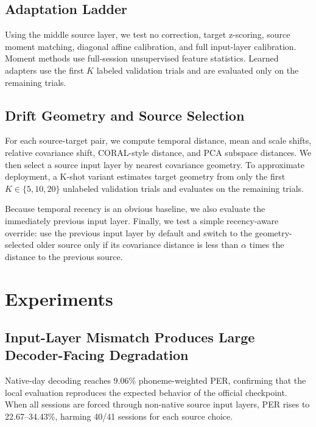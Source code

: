 \documentclass{article}
\begin{document}
\subsection{Adaptation Ladder}
Using the middle source layer, we test no correction, target z-scoring, source moment matching, diagonal affine calibration, and full input-layer calibration. Moment methods use full-session unsupervised feature statistics. Learned adapters use the first $K$ labeled validation trials and are evaluated only on the remaining trials.

\subsection{Drift Geometry and Source Selection}
For each source-target pair, we compute temporal distance, mean and scale shifts, relative covariance shift, CORAL-style distance, and PCA subspace distances. We then select a source input layer by nearest covariance geometry. To approximate deployment, a K-shot variant estimates target geometry from only the first $K \in \{5,10,20\}$ unlabeled validation trials and evaluates on the remaining trials.

Because temporal recency is an obvious baseline, we also evaluate the immediately previous input layer. Finally, we test a simple recency-aware override: use the previous input layer by default and switch to the geometry-selected older source only if its covariance distance is less than $\alpha$ times the distance to the previous source.

\section{Experiments}
\subsection{Input-Layer Mismatch Produces Large Decoder-Facing Degradation}
Native-day decoding reaches 9.06\% phoneme-weighted PER, confirming that the local evaluation reproduces the expected behavior of the official checkpoint. When all sessions are forced through non-native source input layers, PER rises to 22.67--34.43\%, harming 40/41 sessions for each source choice.
\end{document}
